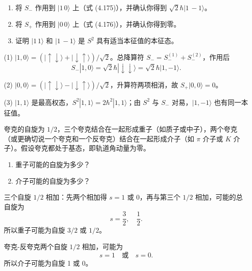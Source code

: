 \begin{question}
\begin{enumerate}
\item 将 $S_-$ 作用到 $|1\,0\rangle$ 上（式 (4.175)），并确认你得到 $\sqrt2\hbar |1\,-1\rangle$。
\item 将 $S_+$ 作用到 $|0\,0\rangle$ 上（式 (4.176)），并确认你得到零。
\item 证明 $|1\,1\rangle$ 和 $|1\,-1\rangle$ 是 $S^2$ 具有适当本征值的本征态。
\end{enumerate}

\par\smallskip
{}

\end{question}
\begin{solution}

(1) $|1,0\rangle=(|\uparrow\downarrow\rangle+|\downarrow\uparrow\rangle)/\sqrt2$。总降算符 $S_-=S_-^{(1)}+S_-^{(2)}$，作用后
\[
S_-|1,0\rangle=\sqrt2\hbar|\downarrow\downarrow\rangle=\sqrt2\hbar|1,-1\rangle.
\]

(2) $|0,0\rangle=(|\uparrow\downarrow\rangle-|\downarrow\uparrow\rangle)/\sqrt2$，升算符两项相消，故 $S_+|0,0\rangle=0$。

(3) $|1,1\rangle$ 是最高权态，$S^2|1,1\rangle=2\hbar^2|1,1\rangle$；由 $S^2$ 与 $S_-$ 对易，$|1,-1\rangle$ 也有同一本征值。

\end{solution}

\begin{question}
夸克的自旋为 $1/2$，三个夸克结合在一起形成重子（如质子或中子），两个夸克（或更确切说一个夸克和一个反夸克）结合在一起形成介子（如 $\pi$ 介子或 $K$ 介子）。假设夸克都处于基态，即轨道角动量为零。
\begin{enumerate}
\item 重子可能的自旋为多少？
\item 介子可能的自旋为多少？
\end{enumerate}
\end{question}
\begin{solution}

三个自旋 $1/2$ 相加：先两个相加得 $s=1$ 或 $0$，再与第三个 $1/2$ 相加，可能的总自旋为
\[
s=\frac32,\quad \frac12.
\]
所以重子可能为自旋 $3/2$ 或 $1/2$。

夸克-反夸克两个自旋 $1/2$ 相加，可能为
\[
s=1\quad \text{或}\quad s=0.
\]
所以介子可能为自旋 1 或 0。

\end{solution}

